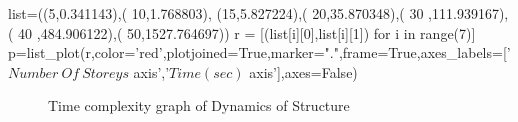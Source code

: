 \begin{sagesilent}
list=((5,0.341143),(
10,1.768803),
(15,5.827224),(
20,35.870348),(
30 ,111.939167),(
40 ,484.906122),(
50,1527.764697))
r = [(list[i][0],list[i][1]) for i in range(7)]
p=list_plot(r,color='red',plotjoined=True,marker=".",frame=True,axes_labels=['$Number \ Of \ Storeys$ axis','$Time(sec)$ axis'],axes=False)
\end{sagesilent}

\begin{figure}
	\caption{Time complexity graph of Dynamics of Structure}
\end{figure}
